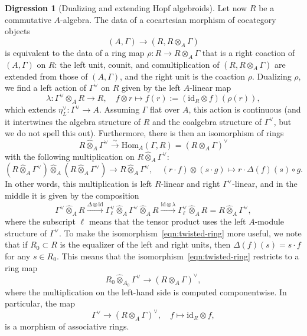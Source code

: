 \documentclass{amsart}
\numberwithin{equation}{section}
\theoremstyle{plain}
\theoremstyle{definition}
\newtheorem{digression}[equation]{Digression}
\def\simto{\xrightarrow{\sim}}
\def\id{\mathrm{id}}
\def\Hom{\mathrm{Hom}}
\def\hatotimes{\mathbin{\widehat\otimes}}
\begin{document}
\begin{digression}[Dualizing and extending Hopf algebroids]
	Let now $R$ be a commutative $A$-algebra. The data of a cocartesian morphism of cocategory objects \[(A,\Gamma)\to (R,R\otimes_A\Gamma)\] is equivalent to the data of a ring map $\rho\colon R\to R\otimes_A\Gamma$ that is a right coaction of $(A,\Gamma)$ on $R$: the left unit, counit, and comultiplication of $(R,R\otimes_A\Gamma)$ are extended from those of $(A,\Gamma)$, and the right unit is the coaction $\rho$. 
	Dualizing $\rho$, we find a left action of $\Gamma^\vee$ on $R$ given by the left $A$-linear map
	\[
	\lambda\colon\Gamma^\vee\otimes_A R\to R,\quad f\otimes r\mapsto f(r):=(\id_R\otimes f)(\rho(r)),
	\]
	which extends $\eta_L^\vee\colon\Gamma^\vee\to A$.
	Assuming $\Gamma$ flat over $A$, this action is continuous (and it intertwines the algebra structure of $R$ and the coalgebra structure of $\Gamma^\vee$, but we do not spell this out). Furthermore, there is then an isomorphism of rings
	\begin{equation}\label{eqn:twisted-ring}
	R\hatotimes_A\Gamma^\vee \simto \Hom_A(\Gamma, R) = (R\otimes_A\Gamma)^\vee
	\end{equation}
	with the following multiplication on $R\hatotimes_A\Gamma^\vee$:
	\[
	(R\hatotimes_A\Gamma^\vee)\hatotimes_A (R\hatotimes_A\Gamma^\vee) \to  R\hatotimes_A\Gamma^\vee,\quad (r\cdot f)\otimes (s\cdot g) \mapsto r\cdot \Delta(f)(s)\circ g.
	\]
	In other words, this multiplication is left $R$-linear and right $\Gamma^\vee$-linear, and in the middle it is given by the composition
	\[
	\Gamma^\vee\hatotimes_A R\xrightarrow{\Delta\otimes\id} \Gamma^\vee_\ell\hatotimes_A\Gamma^\vee \hatotimes_A R \xrightarrow{\id\otimes \lambda} \Gamma^\vee_\ell\hatotimes_AR = R\hatotimes_A\Gamma^\vee,
	\]
	where the subscript $\ell$ means that the tensor product uses the left $A$-module structure of $\Gamma^\vee$.
	To make the isomorphism~\eqref{eqn:twisted-ring} more useful, we note that if $R_0\subset R$ is the equalizer of the left and right units, then $\Delta(f)(s)=s\cdot f$ for any $s\in R_0$. This means that the isomorphism~\eqref{eqn:twisted-ring} restricts to a ring map
	\[
	R_0\hatotimes_{A_0}\Gamma^\vee \to (R\otimes_A\Gamma)^\vee,
	\]
	where the multiplication on the left-hand side is computed componentwise. In particular, the map 
	\[
	\Gamma^\vee\to (R\otimes_A\Gamma)^\vee, \quad f\mapsto\id_R\otimes f,
	\]
	is a morphism of associative rings.
\end{digression}
\end{document}
